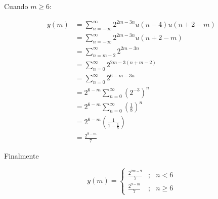 \documentclass[a4paper,12pt,final]{article}
\begin{document}
\begin{enumerate}[label=\alph*)]
          \noindent Cuando $m \geq 6$:

          \begin{equation*}
            \begin{split}
              y\left(m\right) & = \sum_{n=-\infty}^{\infty} 2^{2m-3n} u\left(n-4\right) u\left(n+2-m\right) \\
                              & = \sum_{n=-\infty}^{\infty} 2^{2m-3n} u\left(n+2-m\right) \\
                              & = \sum_{n=m-2}^{\infty} 2^{2m-3n} \\
                              & = \sum_{n=0}^{\infty} 2^{2m-3\left(n+m-2\right)} \\
                              & = \sum_{n=0}^{\infty} 2^{6-m-3n} \\
                              & = 2^{6-m} \sum_{n=0}^{\infty} \left(2^{-3}\right)^{n} \\
                              & = 2^{6-m} \sum_{n=0}^{\infty} \left(\frac{1}{8}\right)^{n} \\
                              & = 2^{6-m} \left(\frac{1}{1-\frac{1}{8}}\right) \\
                              & = \frac{2^{9-m}}{7}
            \end{split}
          \end{equation*}

          \noindent Finalmente

          \begin{equation*}
            y\left(m\right) = \left\{
              \begin{array}{lcl}
                \displaystyle{\frac{2^{2m-9}}{7}} &;& n < 6 \\ [1em]
                \displaystyle{\frac{2^{9-m}}{7}}  &;& n \geq 6
              \end{array}
            \right.
          \end{equation*}


\end{enumerate}
\end{document}

